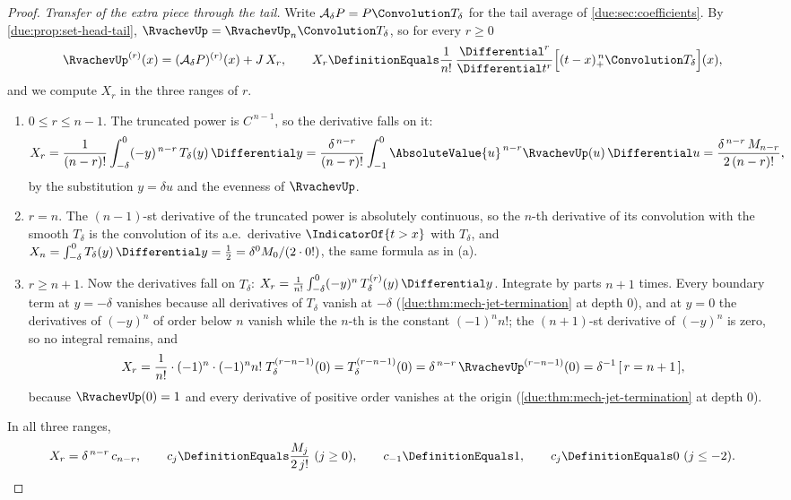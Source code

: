 \documentclass[11pt,oneside]{article}
\theoremstyle{plain}
\theoremstyle{definition}
\theoremstyle{remark}
\newcommand{\upn}[1]{\RvachevUp_{#1}}
\begin{document}
\begin{proof}
\emph{Transfer of the extra piece through the tail.}
Write $\mathcal A_{\delta}P=P\Convolution T_{\delta}$ for the tail average
of \cref{due:sec:coefficients}.  By \cref{due:prop:set-head-tail},
$\RvachevUp=\upn{n}\Convolution T_{\delta}$, so for every $r\ge0$
\begin{equation}
 \RvachevUp^{(r)}(x)=(\mathcal A_{\delta}P)^{(r)}(x)+J\,X_{r},
 \qquad
 X_{r}\DefinitionEquals\frac{1}{n!}\,\frac{\Differential^{r}}{\Differential t^{r}}
 \Bigl[(t-x)_{+}^{\,n}\Convolution T_{\delta}\Bigr](x),
 \label{due:eq:sharp-transfer}
\end{equation}
and we compute $X_{r}$ in the three ranges of $r$.
\begin{enumerate}[label=\textup{(\alph*)}]
\item $0\le r\le n-1$.  The truncated power is $C^{\,n-1}$, so the
 derivative falls on it:
 \[
  X_{r}=\frac{1}{(n-r)!}\int_{-\delta}^{0}(-y)^{\,n-r}\,T_{\delta}(y)\,\Differential y
  =\frac{\delta^{\,n-r}}{(n-r)!}\int_{-1}^{0}\AbsoluteValue{u}^{\,n-r}\RvachevUp(u)\,\Differential u
  =\frac{\delta^{\,n-r}\,M_{n-r}}{2\,(n-r)!},
 \]
 by the substitution $y=\delta u$ and the evenness of $\RvachevUp$.
\item $r=n$.  The $(n-1)$-st derivative of the truncated power is
 absolutely continuous, so the $n$-th derivative of its convolution with the
 smooth $T_{\delta}$ is the convolution of its a.e.\ derivative
 $\IndicatorOf{t>x}$ with $T_{\delta}$, and
 $X_{n}=\int_{-\delta}^{0}T_{\delta}(y)\,\Differential y=\tfrac12
 =\delta^{0}M_{0}/(2\cdot0!)$, the same formula as in (a).
\item $r\ge n+1$.  Now the derivatives fall on $T_{\delta}$:
 $X_{r}=\frac1{n!}\int_{-\delta}^{0}(-y)^{n}\,T_{\delta}^{(r)}(y)\,\Differential y$.
 Integrate by parts $n+1$ times.  Every boundary term at $y=-\delta$
 vanishes because all derivatives of $T_{\delta}$ vanish at $-\delta$
 (\cref{due:thm:mech-jet-termination} at depth $0$), and at $y=0$ the
 derivatives of $(-y)^{n}$ of order below $n$ vanish while the
 $n$-th is the constant $(-1)^{n}n!$; the $(n+1)$-st derivative of
 $(-y)^{n}$ is zero, so no integral remains, and
 \[
  X_{r}=\frac{1}{n!}\cdot(-1)^{n}\cdot(-1)^{n}n!\;T_{\delta}^{(r-n-1)}(0)
  =T_{\delta}^{(r-n-1)}(0)
  =\delta^{\,n-r}\,\RvachevUp^{(r-n-1)}(0)
  =\delta^{-1}\,[\,r=n+1\,],
 \]
 because $\RvachevUp(0)=1$ and every derivative of positive order vanishes
 at the origin (\cref{due:thm:mech-jet-termination} at depth $0$).
\end{enumerate}
In all three ranges,
\begin{equation}
 X_{r}=\delta^{\,n-r}\,c_{n-r},
 \qquad
 c_{j}\DefinitionEquals\frac{M_{j}}{2\,j!}\ (j\ge0),\qquad c_{-1}\DefinitionEquals1,\qquad
 c_{j}\DefinitionEquals0\ (j\le-2).
 \label{due:eq:sharp-Xr}
\end{equation}


\end{proof}
\end{document}
